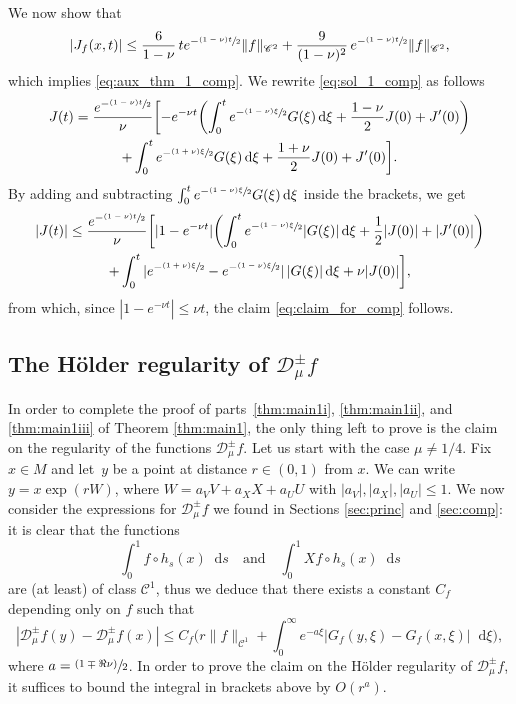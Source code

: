 \documentclass[10pt]{amsart}
\newcommand{\psfrac}[2]{\sfrac{(#1)}{#2}}
\newcommand{\tpsfrac}[3]{\sfrac{(#1)#3}{#2}}
\newcommand*{\diff}{\mathop{}\!\mathrm{d}}
\newcommand{\Dpm}[1]{\mathcal{D}_\mu^{\pm} #1}
\theoremstyle{definition}
\begin{document}
We now show that
\begin{equation}\label{eq:claim_for_comp}
|J_f(x,t)|\leq \frac{6}{1-\nu}\, t e^{-\tpsfrac{1-\nu}{2}t} \|f\|_{\mathscr{C}^2} + \frac{9}{(1-\nu)^2}\, e^{-\tpsfrac{1-\nu}{2}t} \|f\|_{\mathscr{C}^2},
\end{equation}
which implies \eqref{eq:aux_thm_1_comp}.
We rewrite \eqref{eq:sol_1_comp} as follows
\begin{multline*}
J(t) = \frac{e^{-\tpsfrac{1-\nu}{2}t}}{\nu} \biggl[- e^{-\nu t} \biggl(\int_0^t e^{-\tpsfrac{1-\nu}{2}\xi} G(\xi) \diff \xi + \frac{1-\nu}{2} J(0)+J'(0) \biggr) \\
+ \int_0^t e^{-\tpsfrac{1+\nu}{2}\xi} G(\xi) \diff \xi + \frac{1+\nu}{2} J(0) + J'(0) \biggr].
\end{multline*}
By adding and subtracting $\int_0^t e^{-\tpsfrac{1-\nu}{2}\xi} G(\xi) \diff \xi$ inside the brackets, we get
\begin{multline*}
|J(t)|\leq \frac{e^{-\tpsfrac{1-\nu}{2}t}}{\nu} \biggl[|1 - e^{-\nu t}|\biggl(\int_0^t e^{-\tpsfrac{1-\nu}{2}\xi} |G(\xi)|\diff \xi + \frac{1}{2} |J(0)|+|J'(0)|\biggr) \\
+ \int_0^t |e^{-\tpsfrac{1+\nu}{2}\xi} - e^{-\tpsfrac{1-\nu}{2}\xi}|\, |G(\xi)|\diff \xi + \nu |J(0)|\biggr],
\end{multline*}
from which, since $|1-e^{-\nu t}|\leq \nu t$, the claim \eqref{eq:claim_for_comp} follows.


\subsection{The Hölder regularity of $\Dpm{f}$}

In order to complete the proof of parts~\eqref{thm:main1i}, \eqref{thm:main1ii}, and \eqref{thm:main1iii} of Theorem \ref{thm:main1}, the only thing left to prove is the claim on the regularity of the functions $\Dpm{f}$.
Let us start with the case $\mu \neq 1/4$.
Fix $x \in M$ and let~$y$ be a point at distance $r \in (0,1)$ from $x$. We can write $y = x \exp(rW)$, where \hbox{$W = a_VV+a_XX+a_UU$} with $|a_V|, |a_X|, |a_U|\leq 1$.
We now consider the expressions for $\Dpm{f}$ we found in Sections \ref{sec:princ} and \ref{sec:comp}:
it is clear that the functions
\[
\int_0^1 f \circ h_s(x) \diff s \quad\text{and}\quad \int_0^1 Xf \circ h_s(x) \diff s
\]
are (at least) of class $\mathscr{C}^1$, thus we deduce that there exists a constant $C_f$ depending only on $f$ such that
\[
|\Dpm{f}(y) - \Dpm{f}(x)|\leq C_{f} \biggl(r \|f\|_{\mathscr{C}^1} + \int_0^{\infty} e^{-a \xi} |G_{f}(y,\xi) -G_{f}(x,\xi) |\diff \xi \biggr),
\]
where $a = \psfrac{1\mp \Re \nu}{2}$.
In order to prove the claim on the Hölder regularity of $\Dpm{f}$, it suffices to bound the integral in brackets above by $O(r^a)$.
\end{document}
